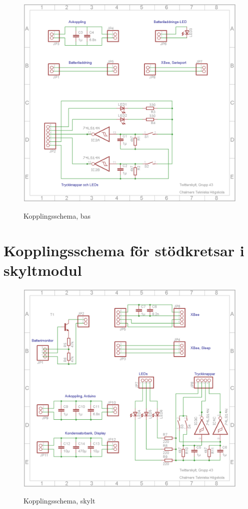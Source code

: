 \documentclass[a4paper,11pt]{article}
\begin{document}
\begin{figure}[H]
\includegraphics[scale=1.0, angle=0]{sch_bas.png}
\label{fig:block_skylt}
\caption{Kopplingsschema, bas}
\end{figure}
\pagebreak

\section{Kopplingsschema för stödkretsar i skyltmodul}

\begin{figure}[H]
\includegraphics[scale=1.0, angle=0]{sch_skylt.png}
\label{fig:block_skylt}
\caption{Kopplingsschema, skylt}
\end{figure}
\pagebreak
\end{document}
